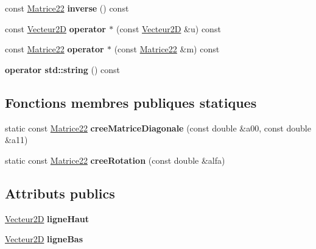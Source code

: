 \begin{DoxyCompactItemize}
const \mbox{\hyperlink{class_matrice22}{Matrice22}} {\bfseries inverse} () const
\item 
\mbox{\label{class_matrice22_a59f341d6e3e61982eff5b7e591192e5a}} 
const \mbox{\hyperlink{class_vecteur2_d}{Vecteur2D}} {\bfseries operator $\ast$} (const \mbox{\hyperlink{class_vecteur2_d}{Vecteur2D}} \&u) const
\item 
\mbox{\label{class_matrice22_a40fee4f5300385282c7321d7019d84bd}} 
const \mbox{\hyperlink{class_matrice22}{Matrice22}} {\bfseries operator $\ast$} (const \mbox{\hyperlink{class_matrice22}{Matrice22}} \&m) const
\item 
\mbox{\label{class_matrice22_a1a182e80f9a70ed8156a7ae20e9b8800}} 
{\bfseries operator std\+::string} () const
\end{DoxyCompactItemize}
\subsection*{Fonctions membres publiques statiques}
\begin{DoxyCompactItemize}
\item 
\mbox{\label{class_matrice22_ab3254d385cb6e4ce41515e03295e1ddb}} 
static const \mbox{\hyperlink{class_matrice22}{Matrice22}} {\bfseries cree\+Matrice\+Diagonale} (const double \&a00, const double \&a11)
\item 
\mbox{\label{class_matrice22_a27a54c0ac5727e620562f5b0db90a186}} 
static const \mbox{\hyperlink{class_matrice22}{Matrice22}} {\bfseries cree\+Rotation} (const double \&alfa)
\end{DoxyCompactItemize}
\subsection*{Attributs publics}
\begin{DoxyCompactItemize}
\item 
\mbox{\label{class_matrice22_a1ccefe5c2adcff56652559ac0ded25fd}} 
\mbox{\hyperlink{class_vecteur2_d}{Vecteur2D}} {\bfseries ligne\+Haut}
\item 
\mbox{\label{class_matrice22_a141885b5fe683b6b3b947ee0ff6588cd}} 
\mbox{\hyperlink{class_vecteur2_d}{Vecteur2D}} {\bfseries ligne\+Bas}
\end{DoxyCompactItemize}
